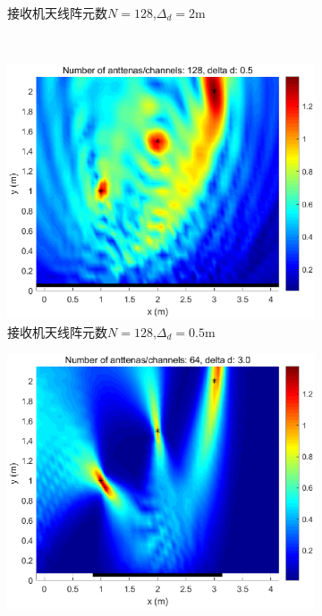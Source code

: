 \begin{figure}[H]
\begin{subfigure}[t]{.45\linewidth}
      \caption{接收机天线阵元数$N=128$,$\Delta_d = 2\text{m}$}
  \end{subfigure}
  \\
  \begin{subfigure}[t]{.45\linewidth}
    \centering
    \includegraphics[width=1\textwidth]{figures/TPF/N128d0.5.eps}
    \caption{接收机天线阵元数$N=128$,$\Delta_d = 0.5\text{m}$}
  \end{subfigure}
  \begin{subfigure}[t]{.45\linewidth}
    \centering
    \includegraphics[width=1\textwidth]{figures/TPF/N64d3.eps}

\end{subfigure}
\end{figure}
